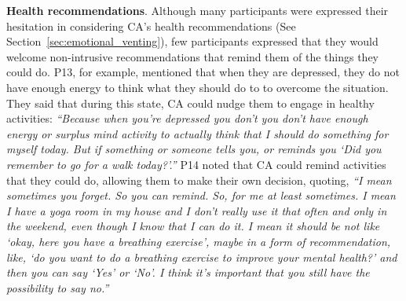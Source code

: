     \textbf{Health recommendations}.
        Although many participants were expressed their hesitation in considering \ac{CA}'s health recommendations (See Section~\ref{sec:emotional_venting}), few participants expressed that they would welcome non-intrusive recommendations that remind them of the things they could do.
        P13, for example, mentioned that when they are depressed, they do not have enough energy to think what they should do to to overcome the situation. They said that during this state, \ac{CA} could nudge them to engage in healthy activities:
        \textit{``Because when you're depressed you don't you don't have enough energy or surplus mind activity to actually think that I should do something for myself today. But if something or someone tells you, or reminds you `Did you remember to go for a walk today?'.'' }
        P14 noted that \ac{CA} could remind activities that they could do, allowing them to make their own decision, quoting,
        \textit{``I mean sometimes you forget. So you can remind. So, for me at least sometimes. I mean I have a yoga room in my house and I don't really use it that often and only in the weekend, even though I know that I can do it. 
        I mean it should be not like `okay, here you have a breathing exercise', maybe in a form of recommendation, like, `do you want to do a breathing exercise to improve your mental health?' and then you can say `Yes' or `No'. I think it's important that you still have the possibility to say no.''}
        
